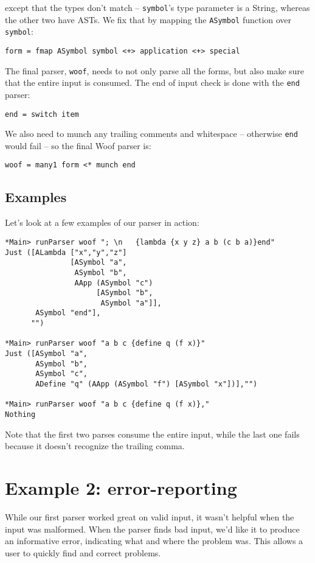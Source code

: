 \documentclass{tmr}
\begin{document}
except that the types don't match -- \verb+symbol+'s type parameter is a String, 
whereas the other two have ASTs.  We fix that by mapping the \verb+ASymbol+ 
function over \verb+symbol+:
\begin{verbatim}
form = fmap ASymbol symbol <+> application <+> special
\end{verbatim}

The final parser, \verb+woof+, needs to not only parse all the forms, but also 
make sure that the entire input is consumed.  The end of input check is done 
with the \verb+end+ parser:
\begin{verbatim}
end = switch item
\end{verbatim}

We also need to munch any trailing comments and whitespace -- otherwise \verb+end+
would fail -- so the final Woof parser is:
\begin{verbatim}
woof = many1 form <* munch end
\end{verbatim}

\subsection{Examples}
Let's look at a few examples of our parser in action:
\begin{verbatim}
*Main> runParser woof "; \n   {lambda {x y z} a b (c b a)}end"
Just ([ALambda ["x","y","z"] 
               [ASymbol "a",
                ASymbol "b",
                AApp (ASymbol "c") 
                     [ASymbol "b",
                      ASymbol "a"]],
       ASymbol "end"],
      "")

*Main> runParser woof "a b c {define q (f x)}"
Just ([ASymbol "a",
       ASymbol "b",
       ASymbol "c",
       ADefine "q" (AApp (ASymbol "f") [ASymbol "x"])],"")

*Main> runParser woof "a b c {define q (f x)},"
Nothing
\end{verbatim}
Note that the first two parses consume the entire input, while the last one 
fails because it doesn't recognize the trailing comma.




\section{Example 2: error-reporting}
While our first parser worked great on valid input, it wasn't helpful
when the input was malformed.  When the parser finds bad input, we'd like it to 
produce an informative error, indicating what and where the problem was.  
This allows a user to quickly find and correct problems.
\end{document}
